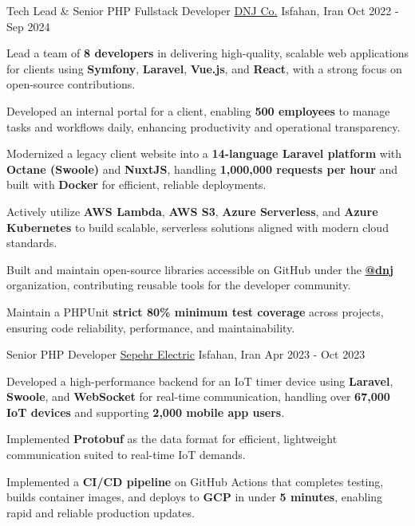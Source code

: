
\begin{cventries}

  \cventry
    {Tech Lead \& Senior PHP Fullstack Developer} %
    {\href{https://dnj.co.ir}{DNJ Co.}} %
    {Isfahan, Iran} %
    {Oct 2022 - Sep 2024} %
    {
      \begin{cvitems}
        \item {Lead a team of \textbf{8 developers} in delivering high-quality, scalable web applications for clients using \textbf{Symfony}, \textbf{Laravel}, \textbf{Vue.js}, and \textbf{React}, with a strong focus on open-source contributions.}
        \item {Developed an internal portal for a client, enabling \textbf{500 employees} to manage tasks and workflows daily, enhancing productivity and operational transparency.}
        \item {Modernized a legacy client website into a \textbf{14-language Laravel platform} with \textbf{Octane (Swoole)} and \textbf{NuxtJS}, handling \textbf{1,000,000 requests per hour} and built with \textbf{Docker} for efficient, reliable deployments.}
        \item {Actively utilize \textbf{AWS Lambda}, \textbf{AWS S3}, \textbf{Azure Serverless}, and \textbf{Azure Kubernetes} to build scalable, serverless solutions aligned with modern cloud standards.}
        \item {Built and maintain open-source libraries accessible on GitHub under the \textbf{\href{https://github.com/dnj}{\faGithubSquare\acvHeaderIconSep @dnj}} organization, contributing reusable tools for the developer community.}
        \item {Maintain a PHPUnit \textbf{strict 80\% minimum test coverage} across projects, ensuring code reliability, performance, and maintainability.}
      \end{cvitems}
    }

  \cventry
    {Senior PHP Developer} %
    {\href{https://www.hinics.com/}{Sepehr Electric}} %
    {Isfahan, Iran} %
    {Apr 2023 - Oct 2023} %
    {
      \begin{cvitems}
        \item {Developed a high-performance backend for an IoT timer device using \textbf{Laravel}, \textbf{Swoole}, and \textbf{WebSocket} for real-time communication, handling over \textbf{67,000 IoT devices} and supporting \textbf{2,000 mobile app users}.}
        \item {Implemented \textbf{Protobuf} as the data format for efficient, lightweight communication suited to real-time IoT demands.}
        \item {Implemented a \textbf{CI/CD pipeline} on GitHub Actions that completes testing, builds container images, and deploys to \textbf{GCP} in under \textbf{5 minutes}, enabling rapid and reliable production updates.}
      \end{cvitems}
    }
  

\end{cventries}
